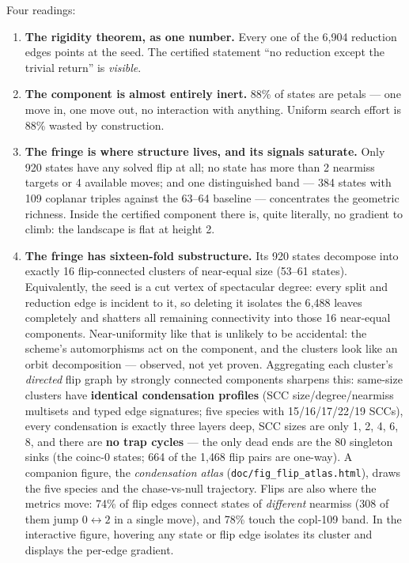 \documentclass[10pt]{article}
\begin{document}
Four readings:
\begin{enumerate}
\item \textbf{The rigidity theorem, as one number.} Every one of the
  6{,}904 reduction edges points at the seed. The certified statement
  ``no reduction except the trivial return'' is \emph{visible}.
\item \textbf{The component is almost entirely inert.} 88\% of states
  are petals --- one move in, one move out, no interaction with
  anything. Uniform search effort is 88\% wasted by construction.
\item \textbf{The fringe is where structure lives, and its signals
  saturate.} Only 920 states have any solved flip at all; no state
  has more than 2 nearmiss targets or 4 available moves; and one
  distinguished band --- 384 states with 109 coplanar triples against
  the 63--64 baseline --- concentrates the geometric richness. Inside
  the certified component there is, quite literally, no gradient to
  climb: the landscape is flat at height 2.
\item \textbf{The fringe has sixteen-fold substructure.} Its 920
  states decompose into exactly 16 flip-connected clusters of
  near-equal size (53--61 states). Equivalently, the seed is a cut
  vertex of spectacular degree: every split and reduction edge is
  incident to it, so deleting it isolates the 6{,}488 leaves
  completely and shatters all remaining connectivity into those 16
  near-equal components. Near-uniformity like that is unlikely to be
  accidental: the scheme's automorphisms act on the
  component, and the clusters look like an orbit decomposition ---
  observed, not yet proven. Aggregating each cluster's \emph{directed}
  flip graph by strongly connected components sharpens this: same-size
  clusters have \textbf{identical condensation profiles} (SCC
  size/degree/nearmiss multisets and typed edge signatures; five
  species with 15/16/17/22/19 SCCs), every condensation is exactly
  three layers deep, SCC sizes are only 1, 2, 4, 6, 8, and there are
  \textbf{no trap cycles} --- the only dead ends are the 80 singleton
  sinks (the coinc-0 states; 664 of the 1{,}468 flip pairs are
  one-way). A companion figure, the \emph{condensation atlas}
  (\texttt{doc/fig\_flip\_atlas.html}), draws the five species and the
  chase-vs-null trajectory. Flips are also where the metrics move:
  74\% of flip edges connect states of \emph{different} nearmiss (308
  of them jump $0 \leftrightarrow 2$ in a single move), and 78\%
  touch the copl-109 band. In the interactive figure, hovering any
  state or flip edge isolates its cluster and displays the per-edge
  gradient.
\end{enumerate}
\end{document}

